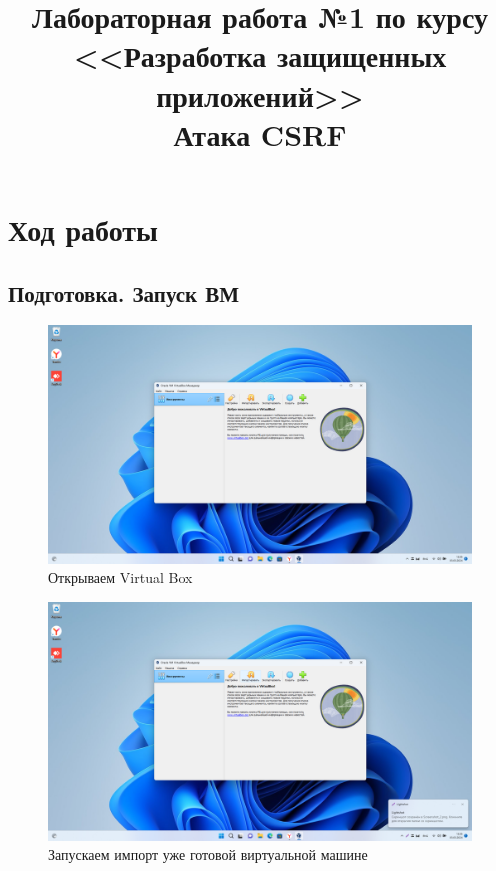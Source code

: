 \documentclass[a4paper]{article}
\title{
  Лабораторная работа №1 по курсу \\
  <<Разработка защищенных приложений>> \\
  Атака CSRF
}
\begin{document}
  \templatedtitlepage
  
  \toc
  \section{Ход работы}

  \subsection{Подготовка. Запуск ВМ}

  \begin{figure}[H]
    \centering
    \includegraphics[width=\textwidth]{Screenshot_2}
    \caption{Открываем Virtual Box}
  \end{figure}

  \begin{figure}[H]
    \centering
    \includegraphics[width=\textwidth]{Screenshot_3}
    \caption{Запускаем импорт уже готовой виртуальной машине}
  \end{figure}
\end{document}
